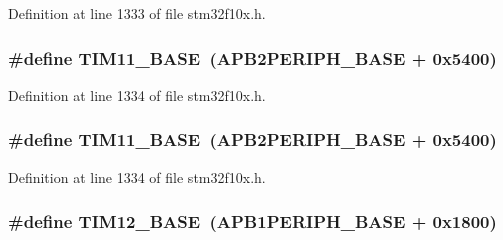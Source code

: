Definition at line 1333 of file stm32f10x.\+h.

\subsubsection[{\texorpdfstring{T\+I\+M11\+\_\+\+B\+A\+SE}{TIM11_BASE}}]{\setlength{\rightskip}{0pt plus 5cm}\#define T\+I\+M11\+\_\+\+B\+A\+SE~({\bf A\+P\+B2\+P\+E\+R\+I\+P\+H\+\_\+\+B\+A\+SE} + 0x5400)}\hypertarget{group___peripheral__memory__map_ga3a4a06bb84c703084f0509e105ffaf1d}{}\label{group___peripheral__memory__map_ga3a4a06bb84c703084f0509e105ffaf1d}


Definition at line 1334 of file stm32f10x.\+h.

\subsubsection[{\texorpdfstring{T\+I\+M11\+\_\+\+B\+A\+SE}{TIM11_BASE}}]{\setlength{\rightskip}{0pt plus 5cm}\#define T\+I\+M11\+\_\+\+B\+A\+SE~({\bf A\+P\+B2\+P\+E\+R\+I\+P\+H\+\_\+\+B\+A\+SE} + 0x5400)}\hypertarget{group___peripheral__memory__map_ga3a4a06bb84c703084f0509e105ffaf1d}{}\label{group___peripheral__memory__map_ga3a4a06bb84c703084f0509e105ffaf1d}


Definition at line 1334 of file stm32f10x.\+h.

\subsubsection[{\texorpdfstring{T\+I\+M12\+\_\+\+B\+A\+SE}{TIM12_BASE}}]{\setlength{\rightskip}{0pt plus 5cm}\#define T\+I\+M12\+\_\+\+B\+A\+SE~({\bf A\+P\+B1\+P\+E\+R\+I\+P\+H\+\_\+\+B\+A\+SE} + 0x1800)}\hypertarget{group___peripheral__memory__map_ga33dea32fadbaecea161c2ef7927992fd}{}\label{group___peripheral__memory__map_ga33dea32fadbaecea161c2ef7927992fd}


